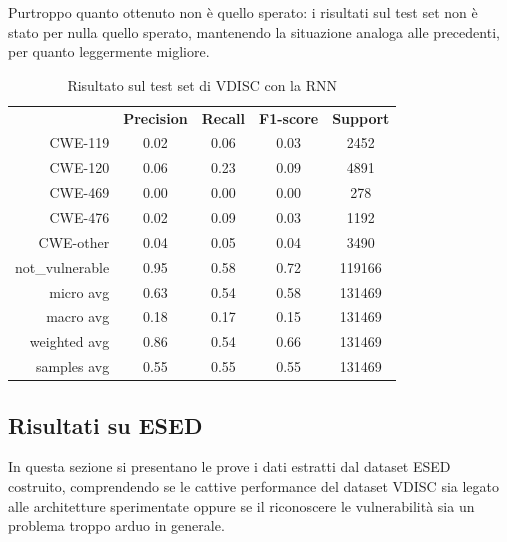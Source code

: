 \documentclass[conference]{IEEEtran}
\begin{document}
%
Purtroppo quanto ottenuto non è quello sperato: i risultati sul test set non è stato per nulla quello sperato, mantenendo la situazione analoga alle precedenti, per quanto leggermente migliore.
%
\begin{table}[h]
    \begin{tabular}{rcccc}
        \multicolumn{1}{l}{} & \textbf{Precision} & \textbf{Recall} & \textbf{F1-score} & \textbf{Support} \\
        CWE-119              & 0.02               & 0.06            & 0.03              & 2452             \\
        CWE-120              & 0.06               & 0.23            & 0.09              & 4891             \\
        CWE-469              & 0.00               & 0.00            & 0.00              & 278              \\
        CWE-476              & 0.02               & 0.09            & 0.03              & 1192             \\
        CWE-other            & 0.04               & 0.05            & 0.04              & 3490             \\
        not\_vulnerable      & 0.95               & 0.58            & 0.72              & 119166           \\
        micro avg            & 0.63               & 0.54            & 0.58              & 131469           \\
        macro avg            & 0.18               & 0.17            & 0.15              & 131469           \\
        weighted avg         & 0.86               & 0.54            & 0.66              & 131469           \\
        samples avg          & 0.55               & 0.55            & 0.55              & 131469          
    \end{tabular}
    \caption{Risultato sul test set di VDISC con la RNN}
\end{table}
%

\subsection{Risultati su ESED}
In questa sezione si presentano le prove i dati estratti dal dataset ESED costruito, comprendendo se le cattive performance del dataset VDISC sia legato alle architetture sperimentate oppure se il riconoscere le vulnerabilità sia un problema troppo arduo in generale.
\end{document}
